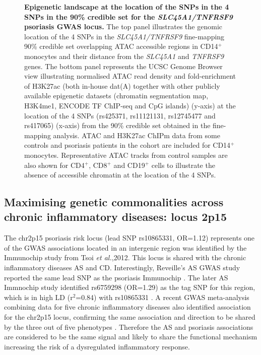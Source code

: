 \begin{figure}[htbp]
\caption[Epigenetic landscape at the location of the SNPs in the 4 SNPs in the 90\% credible set for the \textit{SLC45A1/TNFRSF9} psoriasis GWAS locus.]{\textbf{Epigenetic landscape at the location of the SNPs in the 4 SNPs in the 90\% credible set for the \textit{SLC45A1/TNFRSF9} psoriasis GWAS locus.} The top panel illustrates the genomic location of the 4 SNPs in the \textit{SLC45A1/TNFRSF9} fine-mapping 90\% credible set overlapping ATAC accessible regions in CD14$^+$ monocytes and their distance from the \textit{SLC45A1} and \textit{TNFRSF9} genes. The bottom panel represents the UCSC Genome Browser view illustrating normalised ATAC read density and fold-enrichment of H3K27ac (both in-house dat(A) together with other publicly available epigenetic datasets (chromatin segmentation map, H3K4me1, ENCODE TF ChIP-seq and CpG islands) (y-axis) at the location of the 4 SNPs (rs425371, rs11121131, rs12745477 and rs417065) (x-axis) from the 90\% credible set obtained in the fine-mapping analysis. ATAC and H3K27ac ChIPm data from some controls and psoriasis patients in the cohort are included for CD14$^+$ monocytes. Representative ATAC tracks from control samples are also shown for CD4$^+$, CD8$^+$ and CD19$^+$ cells to illustrate the absence of accessible chromatin at the location of the 4 SNPs.}
\label{figure:ATAC_PS_CTL_TNFSF9_FM}
\end{figure}



 


\subsection{Maximising genetic commonalities across chronic inflammatory diseases: locus 2p15}
The chr2p15 psoriasis risk locus (lead SNP rs10865331, OR=1.12) represents one of the GWAS associations located in an intergenic region was identified by the Immunochip study from Tsoi \textit{et al.},2012. This locus is shared with the chronic inflammatory diseases AS and CD. Interestingly, Reveille's AS GWAS study reported the same lead SNP as the psoriasis Immunochip \parencite{Reveille2010}. The later AS Immnochip study identified rs6759298 (OR=1.29) as the tag SNP for this region, which is in high LD (r$^2$=0.84) with rs10865331 \parencite{Cortes2012}. A recent GWAS meta-analysis combining data for five chronic inflammatory diseases also identified association for the chr2p15 locus, confirming the same association and direction to be shared by the three out of five phenotypes \parencite{Ellinghaus2016}. Therefore the AS and psoriasis associations are considered to be the same signal and likely to share the functional mechanism increasing the risk of a dysregulated inflammatory response.

